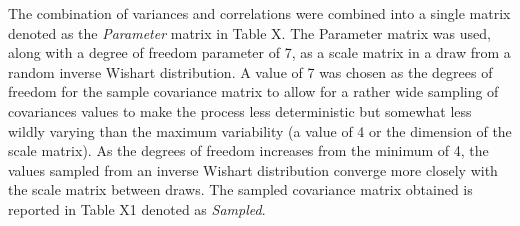 \documentclass[ShortAfour,times,sageapa]{sagej}
\begin{document}
	The combination of variances and correlations were combined into a single matrix denoted as the \emph{Parameter} matrix in Table X.
	The Parameter matrix was used, along with a degree of freedom parameter of 7, as a scale matrix in a draw from a random inverse Wishart distribution.  
	A value of 7 was chosen as the degrees of freedom for the sample covariance matrix to allow for a rather wide sampling of covariances values to make the process less deterministic but somewhat less wildly varying than the maximum variability (a value of 4 or the dimension of the scale matrix).  As the degrees of freedom increases from the minimum of 4, the values sampled from an inverse Wishart distribution converge more closely with the scale matrix between draws.
	The sampled covariance matrix obtained is reported in Table X1 denoted as \emph{Sampled}.
	
\end{document}
